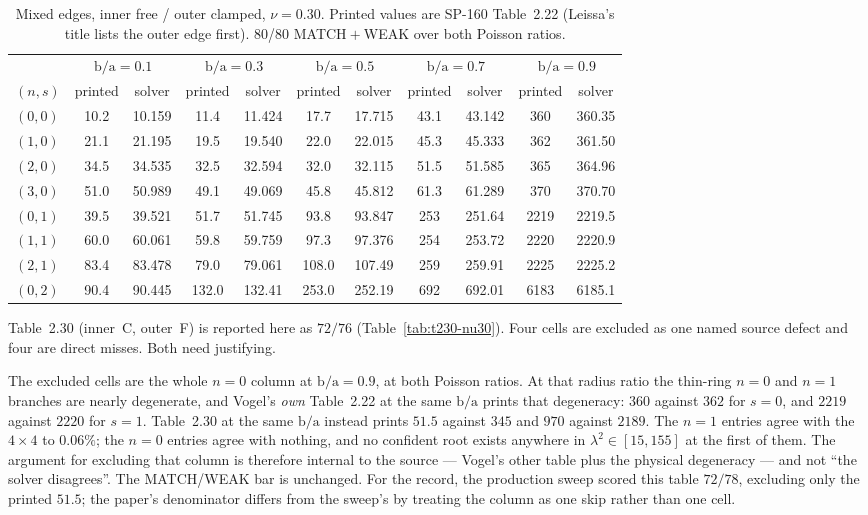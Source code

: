 \documentclass[11pt]{article}
\newcommand{\lamsq}{\lambda^{2}}
\newcommand{\ba}{\mbox{b/a}}
\begin{document}
\begin{table}[htbp]\centering\footnotesize
\caption{Mixed edges, inner free / outer clamped, $\nu=0.30$. Printed values
are SP-160 Table~2.22 \cite{leissaSP160,vogelSkinner} (Leissa's title lists
the outer edge first). 80/80 MATCH${}+{}$WEAK over both Poisson ratios.}
\label{tab:t222-nu30}
\begin{tabular}{lcccccccccc}
\toprule
& \multicolumn{2}{c}{$\ba=0.1$} & \multicolumn{2}{c}{$\ba=0.3$}
& \multicolumn{2}{c}{$\ba=0.5$} & \multicolumn{2}{c}{$\ba=0.7$}
& \multicolumn{2}{c}{$\ba=0.9$}\\
\cmidrule(lr){2-3}\cmidrule(lr){4-5}\cmidrule(lr){6-7}\cmidrule(lr){8-9}\cmidrule(lr){10-11}
$(n,s)$ & printed & solver & printed & solver & printed & solver
& printed & solver & printed & solver\\
\midrule
$(0,0)$ & 10.2 & 10.159 & 11.4 & 11.424 & 17.7 & 17.715 & 43.1 & 43.142 & 360 & 360.35 \\
$(1,0)$ & 21.1 & 21.195 & 19.5 & 19.540 & 22.0 & 22.015 & 45.3 & 45.333 & 362 & 361.50 \\
$(2,0)$ & 34.5 & 34.535 & 32.5 & 32.594 & 32.0 & 32.115 & 51.5 & 51.585 & 365 & 364.96 \\
$(3,0)$ & 51.0 & 50.989 & 49.1 & 49.069 & 45.8 & 45.812 & 61.3 & 61.289 & 370 & 370.70 \\
$(0,1)$ & 39.5 & 39.521 & 51.7 & 51.745 & 93.8 & 93.847 & 253 & 251.64 & 2219 & 2219.5 \\
$(1,1)$ & 60.0 & 60.061 & 59.8 & 59.759 & 97.3 & 97.376 & 254 & 253.72 & 2220 & 2220.9 \\
$(2,1)$ & 83.4 & 83.478 & 79.0 & 79.061 & 108.0 & 107.49 & 259 & 259.91 & 2225 & 2225.2 \\
$(0,2)$ & 90.4 & 90.445 & 132.0 & 132.41 & 253.0 & 252.19 & 692 & 692.01 & 6183 & 6185.1 \\
\bottomrule
\end{tabular}
\end{table}

Table~2.30 (inner~C, outer~F) is reported here as $72/76$
(Table~\ref{tab:t230-nu30}). Four cells are excluded as one named source
defect and four are direct misses. Both need justifying.

The excluded cells are the whole $n=0$ column at $\ba=0.9$, at both Poisson
ratios. At that radius ratio the thin-ring $n=0$ and $n=1$ branches are nearly
degenerate, and Vogel's \emph{own} Table~2.22 at the same $\ba$ prints that
degeneracy: $360$ against $362$ for $s=0$, and $2219$ against $2220$ for
$s=1$. Table~2.30 at the same $\ba$ instead prints $51.5$ against $345$ and
$970$ against $2189$. The $n=1$ entries agree with the $4\times4$ to $0.06\%$;
the $n=0$ entries agree with nothing, and no confident root exists anywhere in
$\lamsq\in[15,155]$ at the first of them. The argument for excluding that
column is therefore internal to the source --- Vogel's other table plus the
physical degeneracy --- and not ``the solver disagrees''. The MATCH/WEAK bar
is unchanged. For the record, the production sweep scored this table $72/78$,
excluding only the printed $51.5$; the paper's denominator differs from the
sweep's by treating the column as one skip rather than one cell.
\end{document}
